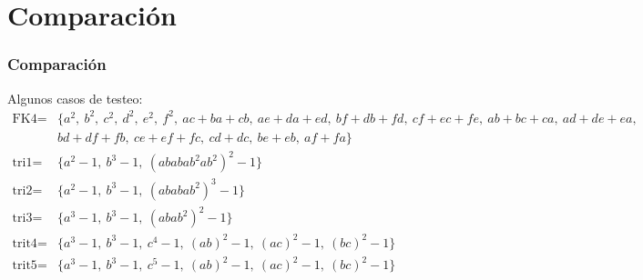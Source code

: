 \documentclass[spanish, aspectratio=169, hidecontrols]{beamer}
\begin{document}
\section{Comparación}

\begin{frame}
  \frametitle{Comparación}
  Algunos casos de testeo:
  \begin{align*}
    \text{FK4} =& \{a^2,\ b^2,\ c^2,\ d^2,\ e^2,\ f^2,\ ac + ba + cb,\ ae + da + ed,\ bf + db + fd,\ cf + ec + fe,\ ab + bc + ca,\ ad + de + ea, \\
      & bd + df + fb,\ ce + ef + fc,\ cd + dc,\ be + eb,\ af + fa\} \\
    \text{tri1} =& \{a^2 - 1,\ b^3 - 1,\ {(ababab^2ab^2)}^2 - 1\} \\
    \text{tri2} =& \{a^2 - 1,\ b^3 - 1,\ {(ababab^2)}^3 - 1\} \\
    \text{tri3} =& \{a^3 - 1,\ b^3 - 1,\ {(abab^2)}^2 - 1\} \\
    \text{trit4} =& \{a^3 - 1,\ b^3 - 1,\ c^4 - 1,\ {(ab)}^2 - 1,\ {(ac)}^2 - 1,\ {(bc)}^2 - 1\} \\
    \text{trit5} =& \{a^3 - 1,\ b^3 - 1,\ c^5 - 1,\ {(ab)}^2 - 1,\ {(ac)}^2 - 1,\ {(bc)}^2 - 1\}
  \end{align*}
\end{frame}
\end{document}
